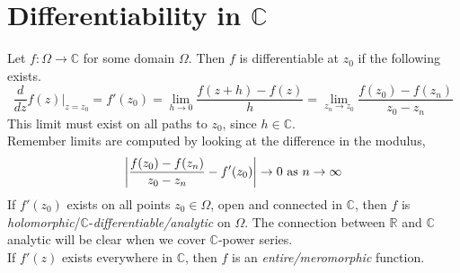\documentclass[11pt]{article}
\DeclarePairedDelimiter\abs{\lvert}{\rvert}
\begin{document}
\section{Differentiability in $\mathbb{C}$}
Let $f: \Omega \to \mathbb{C}$ for some domain $\Omega$. Then $f$ is differentiable at $z_0$ if the following exists. 
$$\frac{d}{dz}f(z)|_{z = z_0} = f'(z_0) = \lim_{h\to0}\frac{f(z + h) - f(z)}{h} = \lim_{z_n \to z_0} \frac{f(z_0) - f(z_n)}{z_0 - z_n}$$
This limit must exist on all paths to $z_0$, since $h \in \mathbb{C}$. \\
Remember limits are computed by looking at the difference in the modulus, 
$$\abs*{\frac{f(z_0) - f(z_n)}{z_0 - z_n} - f'(z_0)} \to 0 \text{ as } n \to \infty$$
If $f'(z_0)$ exists on all points $z_0 \in \Omega$, open and connected in $\mathbb{C}$, then $f$ is \textit{holomorphic}/$\mathbb{C}$-\textit{differentiable/analytic} on $\Omega$. The connection between $\mathbb{R}$ and $\mathbb{C}$ analytic will be clear when we cover $\mathbb{C}$-power series. \\
If $f'(z)$ exists everywhere in $\mathbb{C}$, then $f$ is an \textit{entire/meromorphic} function.  
\end{document}
